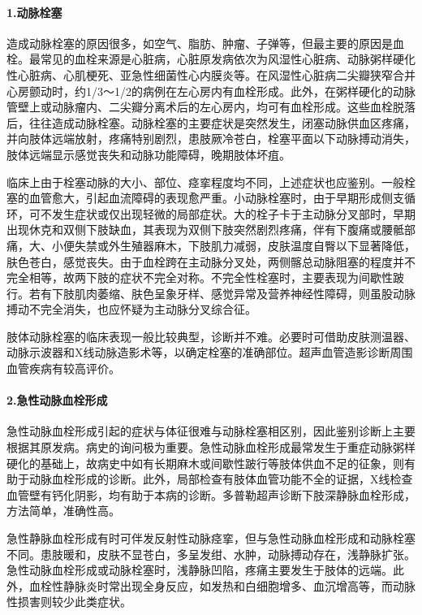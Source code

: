 \paragraph{1.动脉栓塞}

造成动脉栓塞的原因很多，如空气、脂肪、肿瘤、子弹等，但最主要的原因是血栓。最常见的血栓来源是心脏病，心脏原发病依次为风湿性心脏病、动脉粥样硬化性心脏病、心肌梗死、亚急性细菌性心内膜炎等。在风湿性心脏病二尖瓣狭窄合并心房颤动时，约1/3～1/2的病例在左心房内有血栓形成。此外，在粥样硬化的动脉管壁上或动脉瘤内、二尖瓣分离术后的左心房内，均可有血栓形成。这些血栓脱落后，往往造成动脉栓塞。动脉栓塞的主要症状是突然发生，闭塞动脉供血区疼痛，并向肢体远端放射，疼痛特别剧烈，患肢厥冷苍白，栓塞平面以下动脉搏动消失，肢体远端显示感觉丧失和动脉功能障碍，晚期肢体坏疽。

临床上由于栓塞动脉的大小、部位、痉挛程度均不同，上述症状也应鉴别。一般栓塞的血管愈大，引起血流障碍的表现愈严重。小动脉栓塞时，由于早期形成侧支循环，可不发生症状或仅出现轻微的局部症状。大的栓子卡于主动脉分叉部时，早期出现休克和双侧下肢缺血，其表现为双侧下肢突然剧烈疼痛，伴有下腹痛或腰骶部痛，大、小便失禁或外生殖器麻木，下肢肌力减弱，皮肤温度自臀以下显著降低，肤色苍白，感觉丧失。由于血栓跨在主动脉分叉处，两侧髂总动脉阻塞的程度并不完全相等，故两下肢的症状不完全对称。不完全性栓塞时，主要表现为间歇性跛行。若有下肢肌肉萎缩、肤色呈象牙样、感觉异常及营养神经性障碍，则虽股动脉搏动不完全消失，也应怀疑为主动脉分叉综合征。

肢体动脉栓塞的临床表现一般比较典型，诊断并不难。必要时可借助皮肤测温器、动脉示波器和X线动脉造影术等，以确定栓塞的准确部位。超声血管造影诊断周围血管疾病有较高评价。

\paragraph{2.急性动脉血栓形成}

急性动脉血栓形成引起的症状与体征很难与动脉栓塞相区别，因此鉴别诊断上主要根据其原发病。病史的询问极为重要。急性动脉血栓形成最常发生于重症动脉粥样硬化的基础上，故病史中如有长期麻木或间歇性跛行等肢体供血不足的征象，则有助于动脉血栓形成的诊断。此外，局部检查有肢体血管功能不全的证据，X线检查血管壁有钙化阴影，均有助于本病的诊断。多普勒超声诊断下肢深静脉血栓形成，方法简单，准确性高。

急性静脉血栓形成有时可伴发反射性动脉痉挛，但与急性动脉血栓形成和动脉栓塞不同。患肢暖和，皮肤不显苍白，多呈发绀、水肿，动脉搏动存在，浅静脉扩张。急性动脉血栓形成或动脉栓塞时，浅静脉凹陷，疼痛主要发生于肢体的远端。此外，血栓性静脉炎时常出现全身反应，如发热和白细胞增多、血沉增高等，而动脉性损害则较少此类症状。

